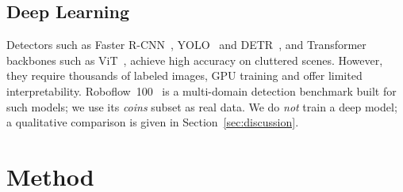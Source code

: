 \documentclass[conference,a4paper]{IEEEtran}
\begin{document}
\subsection{Deep Learning}
Detectors such as Faster R-CNN~\cite{ren2015}, YOLO~\cite{redmon2016} and DETR~\cite{carion2020}, and Transformer backbones such as ViT~\cite{dosovitskiy2021}, achieve high accuracy on cluttered scenes. However, they require thousands of labeled images, GPU training and offer limited interpretability. Roboflow~100~\cite{ciaglia2022rf100} is a multi-domain detection benchmark built for such models; we use its \emph{coins} subset as real data. We do \emph{not} train a deep model; a qualitative comparison is given in Section~\ref{sec:discussion}.

\section{Method}\label{sec:method}
\end{document}
